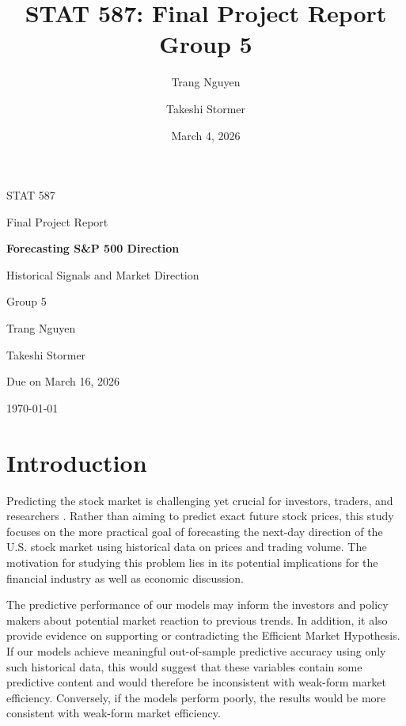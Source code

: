 \documentclass[11pt]{article}
\title{STAT 587: Final Project Report\\[0.5em]
\large Group 5}
\author{Trang Nguyen \and Takeshi Stormer}
\date{March 4, 2026}
\begin{document}
\begin{titlepage}
    \centering
    \vspace*{1.5cm}
    
    {\Large STAT 587 \par}
    \vspace{0.3cm}
    {\large Final Project Report \par}
    
    \vspace{2cm}
    
    {\LARGE\bfseries Forecasting S\&P 500 Direction \par}
    \vspace{0.4cm}
    {\Large Historical Signals and Market Direction \par}
    
    \vspace{1.8cm}
    
    {\large Group 5 \par}
    \vspace{1cm}
    
    {\large Trang Nguyen \par}
    {\large Takeshi Stormer \par}
    
    \vfill
    
    {\large Due on March 16, 2026 \par}
    \vspace{0.3cm}
    {\large \today \par}
\end{titlepage}

\tableofcontents
\newpage      

\section{Introduction}

\quad Predicting the stock market is challenging yet crucial for investors, traders, and researchers \cite{LIN_2024}. Rather than aiming to predict exact future stock prices, this study focuses on the more practical goal of forecasting the next-day direction of the U.S. stock market using historical data on prices and trading volume. The motivation for studying this problem lies in its potential implications for the financial industry as well as economic discussion. 

The predictive performance of our models may inform the investors and policy makers about potential market reaction to previous trends. In addition, it also provide evidence on supporting or contradicting the Efficient Market Hypothesis. If our models achieve meaningful out-of-sample predictive accuracy using only such historical data, this would suggest that these variables contain some predictive content and would therefore be inconsistent with weak-form market efficiency. Conversely, if the models perform poorly, the results would be more consistent with weak-form market efficiency.
\end{document}
